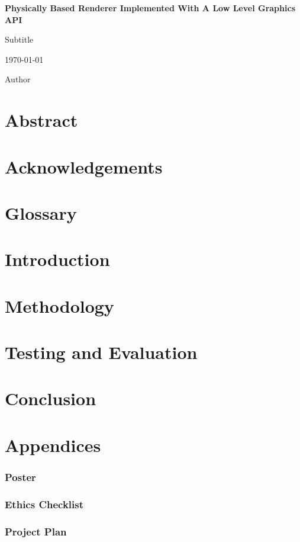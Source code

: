 \documentclass[12pt, a4paper]{article}
\newcommand{\titlevar}{Physically Based Renderer Implemented With A Low Level Graphics API}
\newcommand{\mysection}[1]{\pagebreak \section{#1}}
\begin{document}
        
\begin{titlepage}
        \begin{center}
                \vspace*{1cm}
                \Huge
                \textbf{\titlevar}

                \large
                \vspace{0.5cm}
                Subtitle

        \vspace{0.5cm}
        \today{}

                \vspace{0.5cm}
                Author

                \vfill

    \end{center}

\end{titlepage}

\mysection{Abstract}

        
\mysection{Acknowledgements}


\pagebreak
\tableofcontents
{}
\listoffigures

\pagebreak
\mysection{Glossary}



\mysection{Introduction}


\mysection{Methodology}


\mysection{Testing and Evaluation}


\mysection{Conclusion}


\mysection{Appendices}

\subsubsection{Poster}


\subsubsection{Ethics Checklist}


\subsubsection{Project Plan}


\pagebreak
\printbibliography[heading=bibintoc]{}
\end{document}
